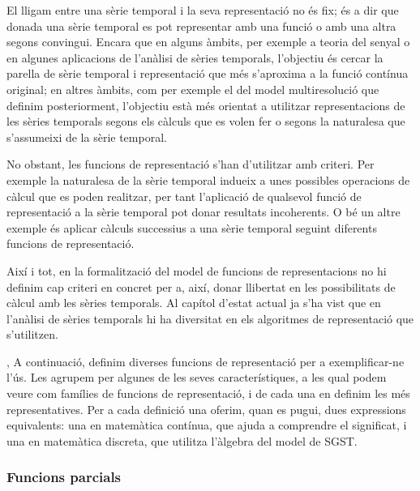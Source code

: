 El lligam entre una sèrie temporal i la seva representació no és fix;
és a dir que donada una sèrie temporal es pot representar amb una
funció o amb una altra segons convingui.  Encara que en alguns àmbits,
per exemple a teoria del senyal o en algunes aplicacions de l'anàlisi
de sèries temporals, l'objectiu és cercar la parella de sèrie temporal
i representació que més s'aproxima a la funció contínua original; en
altres àmbits, com per exemple el del model multiresolució que definim
posteriorment, l'objectiu està més orientat a utilitzar
representacions de les sèries temporals segons els càlculs que es
volen fer o segons la naturalesa que s'assumeixi de la sèrie temporal.


No obstant, les funcions de representació s'han d'utilitzar amb
criteri. Per exemple la naturalesa de la sèrie temporal indueix a unes
possibles operacions de càlcul que es poden realitzar, per tant
l'aplicació de qualsevol funció de representació a la sèrie temporal
pot donar resultats incoherents. O bé un altre exemple és aplicar
càlculs successius a una sèrie temporal seguint diferents funcions de
representació.  

Així i tot, en la formalització del model de funcions de
representacions no hi definim cap criteri en concret per a, així,
donar llibertat en les possibilitats de càlcul amb les sèries
temporals. Al capítol  d'estat actual ja s'ha vist que en
l'anàlisi de sèries temporals hi ha diversitat en els algoritmes de
representació que s'utilitzen.

,
A continuació, definim diverses funcions de representació per a
exemplificar-ne l'ús. Les agrupem per algunes de les seves
característiques, a les qual podem veure com famílies de funcions de
representació, i de cada una en definim les més representatives. Per a
cada definició una oferim, quan es pugui, dues expressions
equivalents: una en matemàtica contínua, que ajuda a comprendre el
significat, i una en matemàtica discreta, que utilitza l'àlgebra del
model de SGST.



\subsubsection{Funcions parcials}

